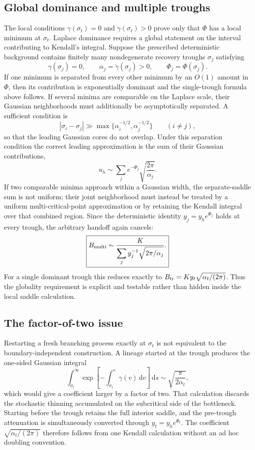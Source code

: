\documentclass[11pt]{article}
\newcommand{\dd}{\,\mathrm{d}}
\begin{document}
\subsection{Global dominance and multiple troughs}
\label{sec:multisaddle}
The local conditions $\gamma(\sigma_t)=0$ and $\dot\gamma(\sigma_t)>0$ prove only that $\Phi$ has a local minimum at $\sigma_t$.  Laplace dominance requires a global statement on the interval contributing to Kendall's integral.  Suppose the prescribed deterministic background contains finitely many nondegenerate recovery troughs $\sigma_j$ satisfying
\[
\gamma(\sigma_j)=0,
\qquad
\alpha_j=\dot\gamma(\sigma_j)>0,
\qquad
\Phi_j=\Phi(\sigma_j).
\]
If one minimum is separated from every other minimum by an $O(1)$ amount in $\Phi$, then its contribution is exponentially dominant and the single-trough formula above follows. If several minima are comparable on the Laplace scale, their Gaussian neighborhoods must additionally be asymptotically separated. A sufficient condition is
\[
|\sigma_i-\sigma_j|
\gg
\max\{\alpha_i^{-1/2},\alpha_j^{-1/2}\}
\qquad(i\neq j),
\]
so that the leading Gaussian cores do not overlap. Under this separation condition the correct leading approximation is the sum of their Gaussian contributions,
\[
u_h
\sim
\sum_j e^{-\Phi_j}\sqrt{\frac{2\pi}{\alpha_j}}.
\]
If two comparable minima approach within a Gaussian width, the separate-saddle sum is not uniform; their joint neighborhood must instead be treated by a uniform multi-critical-point approximation or by retaining the Kendall integral over that combined region.
Since the deterministic identity $y_j=y_h e^{\Phi_j}$ holds at every trough, the arbitrary handoff again cancels:
\[
\boxed{
B_{\rm multi}
\sim
\frac{K}{\displaystyle\sum_j y_j^{-1}\sqrt{2\pi/\alpha_j}}.
}
\]
For a single dominant trough this reduces exactly to $B_{\rm tr}=K y_t\sqrt{\alpha_t/(2\pi)}$.  Thus the globality requirement is explicit and testable rather than hidden inside the local saddle calculation.

\subsection{The factor-of-two issue}
Restarting a fresh branching process exactly at $\sigma_t$ is not equivalent to the boundary-independent construction.  A lineage started at the trough produces the one-sided Gaussian integral
\[
\int_{\sigma_t}^{\infty}
\exp\left[-\int_{\sigma_t}^{s}\gamma(v)\dd v\right]\dd s
\sim\sqrt{\frac{\pi}{2\alpha_t}},
\]
which would give a coefficient larger by a factor of two.  That calculation discards the stochastic thinning accumulated on the subcritical side of the bottleneck.  Starting before the trough retains the full interior saddle, and the pre-trough attenuation is simultaneously converted through $y_t=y_h e^{\Phi_t}$.  The coefficient $\sqrt{\alpha_t/(2\pi)}$ therefore follows from one Kendall calculation without an ad hoc doubling convention.
\end{document}
